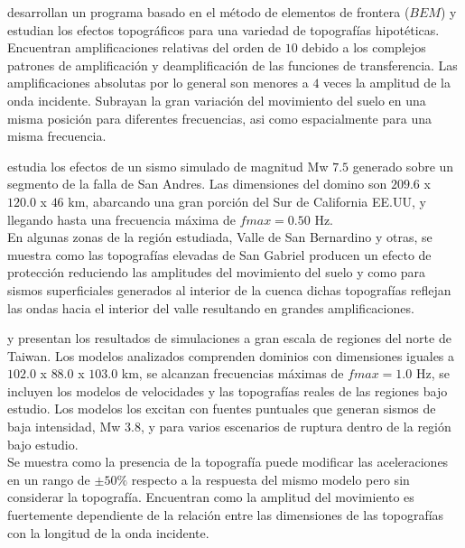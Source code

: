 \documentclass[spanish,letterpaper,12pt,twoside,openany]{article}
\begin{document}
\citep{SanchezSesma1991} desarrollan un programa basado en el método de elementos de frontera ($BEM$) y estudian los efectos topográficos para una variedad de topografías hipotéticas. Encuentran amplificaciones relativas del orden de $10$ debido a los complejos patrones de amplificación y deamplificación de las funciones de transferencia. Las amplificaciones absolutas por lo general son menores a $4$ veces la amplitud de la onda incidente. Subrayan la gran variación del movimiento del suelo en una misma posición para diferentes frecuencias, asi como espacialmente para una misma frecuencia.

\citep{Ma2007} estudia los efectos de un sismo simulado de magnitud Mw $7.5$ generado sobre un segmento de la falla de San Andres. Las dimensiones del domino son $209.6$ x $120.0$ x $46$ km, abarcando una gran porción del Sur de California EE.UU, y llegando hasta una frecuencia máxima de $fmax=0.50$ Hz.\\
%
En algunas zonas de la región estudiada, Valle de San Bernardino y otras, se muestra como las topografías elevadas de San Gabriel producen un efecto de protección reduciendo las amplitudes del movimiento del suelo y como para sismos superficiales generados al interior de la cuenca dichas topografías reflejan las ondas hacia el interior del valle resultando en grandes amplificaciones.

\citep{Lee2009b} y \citep{Lee2009a} presentan los resultados de simulaciones a gran escala de regiones del norte de Taiwan. Los modelos analizados comprenden dominios con dimensiones iguales a $102.0$ x $88.0$ x $103.0$ km, se alcanzan frecuencias máximas de $fmax = 1.0$ Hz, se incluyen los modelos de velocidades y las topografías reales de las regiones bajo estudio. Los modelos los excitan con fuentes puntuales que generan sismos de baja intensidad, Mw $3.8$, y para varios escenarios de ruptura dentro de la región bajo estudio.\\
%
Se muestra como la presencia de la topografía puede modificar las aceleraciones en un rango de $\pm 50 \%$ respecto a la respuesta del mismo modelo pero sin considerar la topografía. Encuentran como la amplitud del movimiento es fuertemente dependiente de la relación entre las dimensiones de las topografías con la longitud de la onda incidente.
\end{document}
